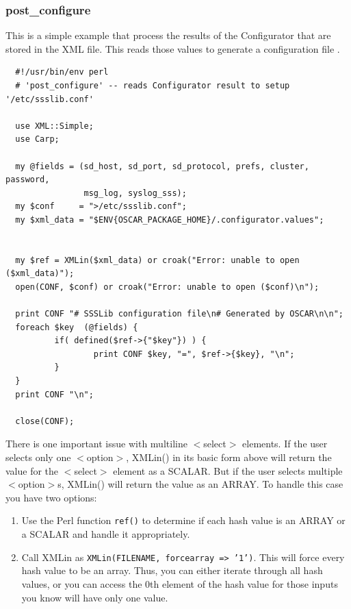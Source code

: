 \subsubsection{post\_configure}

This is a simple  example that process the results
of the Configurator that are stored in the XML 
file.  This reads those values to generate a configuration file
.

\begin{scriptsize}
\begin{verbatim}
  #!/usr/bin/env perl
  # 'post_configure' -- reads Configurator result to setup '/etc/ssslib.conf'

  use XML::Simple;
  use Carp;

  my @fields = (sd_host, sd_port, sd_protocol, prefs, cluster, password, 
                msg_log, syslog_sss);
  my $conf     = ">/etc/ssslib.conf";
  my $xml_data = "$ENV{OSCAR_PACKAGE_HOME}/.configurator.values";


  my $ref = XMLin($xml_data) or croak("Error: unable to open ($xml_data)");
  open(CONF, $conf) or croak("Error: unable to open ($conf)\n");

  print CONF "# SSSLib configuration file\n# Generated by OSCAR\n\n";
  foreach $key  (@fields) {
          if( defined($ref->{"$key"}) ) {
                  print CONF $key, "=", $ref->{$key}, "\n";
          }
  }
  print CONF "\n";

  close(CONF);
\end{verbatim}
\end{scriptsize}

There is one important issue with multiline $<$select$>$ elements.  If the
user selects only one $<$option$>$, XMLin() in its basic form above will
return the value for the $<$select$>$ element as a SCALAR.  But if the user
selects multiple $<$option$>$s, XMLin() will return the value as an ARRAY.
To handle this case you have two options:

\begin{enumerate}
\item Use the Perl function \texttt{ref()} to determine if each hash value is
an ARRAY or a SCALAR and handle it appropriately.  
\item Call XMLin as \texttt{XMLin(FILENAME, forcearray => '1')}.  This will
force every hash value to be an array.  Thus, you can either iterate through
all hash values, or you can access the 0th element of the hash value for
those inputs you know will have only one value.
\end{enumerate}



